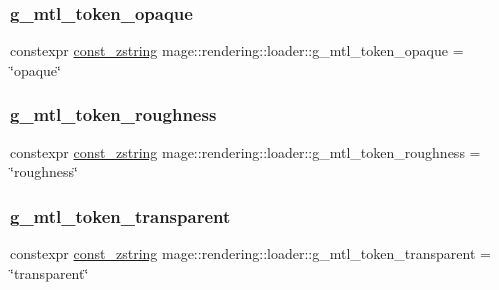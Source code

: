 \hypertarget{namespacemage_1_1rendering_1_1loader_a6f5ffd9bd3336fb8589c59a322ca2b1e}{}\label{namespacemage_1_1rendering_1_1loader_a6f5ffd9bd3336fb8589c59a322ca2b1e} 
\subsubsection{\texorpdfstring{g\+\_\+mtl\+\_\+token\+\_\+opaque}{g\_mtl\_token\_opaque}}
{\footnotesize\ttfamily constexpr \hyperlink{namespacemage_abfd9206dc607ceb5d13ec68bf075a5c0}{const\+\_\+zstring} mage\+::rendering\+::loader\+::g\+\_\+mtl\+\_\+token\+\_\+opaque = \char`\"{}opaque\char`\"{}}

\hypertarget{namespacemage_1_1rendering_1_1loader_a2ec32e8ddd043f1989ca6b58ad964c32}{}\label{namespacemage_1_1rendering_1_1loader_a2ec32e8ddd043f1989ca6b58ad964c32} 
\subsubsection{\texorpdfstring{g\+\_\+mtl\+\_\+token\+\_\+roughness}{g\_mtl\_token\_roughness}}
{\footnotesize\ttfamily constexpr \hyperlink{namespacemage_abfd9206dc607ceb5d13ec68bf075a5c0}{const\+\_\+zstring} mage\+::rendering\+::loader\+::g\+\_\+mtl\+\_\+token\+\_\+roughness = \char`\"{}roughness\char`\"{}}

\hypertarget{namespacemage_1_1rendering_1_1loader_a2e86bdf00ab5d9721684b02b575a9df7}{}\label{namespacemage_1_1rendering_1_1loader_a2e86bdf00ab5d9721684b02b575a9df7} 
\subsubsection{\texorpdfstring{g\+\_\+mtl\+\_\+token\+\_\+transparent}{g\_mtl\_token\_transparent}}
{\footnotesize\ttfamily constexpr \hyperlink{namespacemage_abfd9206dc607ceb5d13ec68bf075a5c0}{const\+\_\+zstring} mage\+::rendering\+::loader\+::g\+\_\+mtl\+\_\+token\+\_\+transparent = \char`\"{}transparent\char`\"{}}


